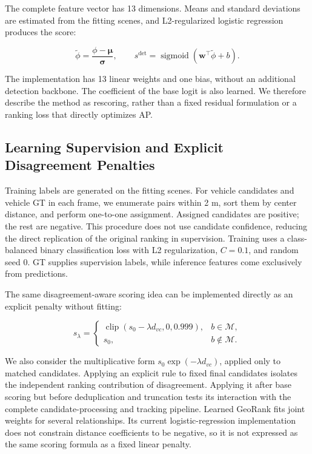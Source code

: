The complete feature vector has 13 dimensions. Means and standard deviations are estimated from the fitting scenes, and L2-regularized logistic regression produces the score:

\[
\tilde\phi=\frac{\phi-\boldsymbol\mu}{\boldsymbol\sigma},\qquad
s^{\mathrm{det}}=\operatorname{sigmoid}(\mathbf w^\top\tilde\phi+b).
\]

The implementation has 13 linear weights and one bias, without an additional detection backbone. The coefficient of the base logit is also learned. We therefore describe the method as rescoring, rather than a fixed residual formulation or a ranking loss that directly optimizes AP.

\subsection{Learning Supervision and Explicit Disagreement Penalties}

Training labels are generated on the fitting scenes. For vehicle candidates and vehicle GT in each frame, we enumerate pairs within 2 m, sort them by center distance, and perform one-to-one assignment. Assigned candidates are positive; the rest are negative. This procedure does not use candidate confidence, reducing the direct replication of the original ranking in supervision. Training uses a class-balanced binary classification loss with L2 regularization, $C=0.1$, and random seed 0. GT supplies supervision labels, while inference features come exclusively from predictions.

The same disagreement-aware scoring idea can be implemented directly as an explicit penalty without fitting:

\[
s_\lambda=\begin{cases}
\operatorname{clip}(s_0-\lambda d_{vc},0,0.999), & b\in\mathcal M,\\
s_0, & b\notin\mathcal M.
\end{cases}
\]

We also consider the multiplicative form $s_0\exp(-\lambda d_{vc})$, applied only to matched candidates. Applying an explicit rule to fixed final candidates isolates the independent ranking contribution of disagreement. Applying it after base scoring but before deduplication and truncation tests its interaction with the complete candidate-processing and tracking pipeline. Learned GeoRank fits joint weights for several relationships. Its current logistic-regression implementation does not constrain distance coefficients to be negative, so it is not expressed as the same scoring formula as a fixed linear penalty.

